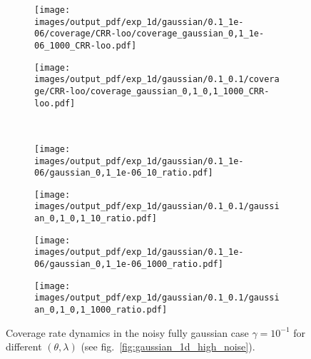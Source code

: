 \documentclass[a4paper,14pt]{extarticle}
\begin{document}
\begin{figure}
\begin{subfigure}[b]{0.25\linewidth}
  \end{subfigure}%
  \begin{subfigure}[b]{0.25\linewidth}
    \texttt{[image: images/output\_pdf/exp\_1d/gaussian/0.1\_1e-06/coverage/CRR-loo/coverage\_gaussian\_0,1\_1e-06\_1000\_CRR-loo.pdf]}
  \end{subfigure}%
  \begin{subfigure}[b]{0.25\linewidth}
    \texttt{[image: images/output\_pdf/exp\_1d/gaussian/0.1\_0.1/coverage/CRR-loo/coverage\_gaussian\_0,1\_0,1\_1000\_CRR-loo.pdf]}
  \end{subfigure}\\
  \begin{subfigure}[b]{0.25\linewidth}
    \texttt{[image: images/output\_pdf/exp\_1d/gaussian/0.1\_1e-06/gaussian\_0,1\_1e-06\_10\_ratio.pdf]}
    \caption{} \label{fig:gaussian_1d_high_noise_arb_c1}
  \end{subfigure}%
  \begin{subfigure}[b]{0.25\linewidth}
    \texttt{[image: images/output\_pdf/exp\_1d/gaussian/0.1\_0.1/gaussian\_0,1\_0,1\_10\_ratio.pdf]}
    \caption{} \label{fig:gaussian_1d_high_noise_arb_c2}
  \end{subfigure}%
  \begin{subfigure}[b]{0.25\linewidth}
    \texttt{[image: images/output\_pdf/exp\_1d/gaussian/0.1\_1e-06/gaussian\_0,1\_1e-06\_1000\_ratio.pdf]}
    \caption{} \label{fig:gaussian_1d_high_noise_arb_c3}
  \end{subfigure}%
  \begin{subfigure}[b]{0.25\linewidth}
    \texttt{[image: images/output\_pdf/exp\_1d/gaussian/0.1\_0.1/gaussian\_0,1\_0,1\_1000\_ratio.pdf]}
    \caption{} \label{fig:gaussian_1d_high_noise_arb_c4}
  \end{subfigure}%
  \caption{Coverage rate dynamics in the noisy fully gaussian case $\gamma=10^{-1}$
  for different $(\theta, \lambda)$ (see fig.~\ref{fig:gaussian_1d_high_noise}).}
  \label{fig:gaussian_1d_high_noise_arb}
\end{figure}
\end{document}
